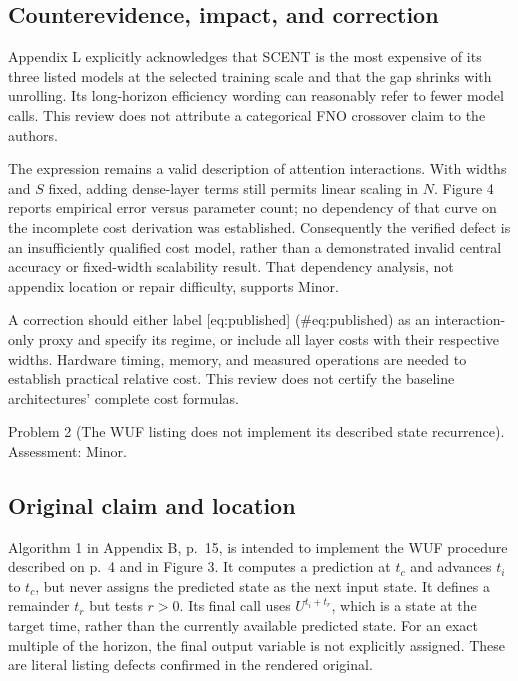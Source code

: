 \documentclass[10pt]{article}
\begin{document}
\subsection*{Counterevidence, impact, and correction}
Appendix L explicitly acknowledges that SCENT is the most expensive of its three listed models at the selected training scale and that the gap shrinks with unrolling. Its long-horizon efficiency wording can reasonably refer to fewer model calls. This review does not attribute a categorical FNO crossover claim to the authors.\par
The expression remains a valid description of attention interactions. With widths and \(S\) fixed, adding dense-layer terms still permits linear scaling in \(N\). Figure 4 reports empirical error versus parameter count; no dependency of that curve on the incomplete cost derivation was established. Consequently the verified defect is an insufficiently qualified cost model, rather than a demonstrated invalid central accuracy or fixed-width scalability result. That dependency analysis, not appendix location or repair difficulty, supports Minor.\par
A correction should either label [eq:published] (\#eq:published) as an interaction-only proxy and specify its regime, or include all layer costs with their respective widths. Hardware timing, memory, and measured operations are needed to establish practical relative cost. This review does not certify the baseline architectures’ complete cost formulas.\par
Problem 2 (The WUF listing does not implement its described state recurrence).  Assessment: Minor.\par
\subsection*{Original claim and location}
Algorithm 1 in Appendix B, p. 15, is intended to implement the WUF procedure described on p. 4 and in Figure 3. It computes a prediction at \(t_c\) and advances \(t_i\) to \(t_c\), but never assigns the predicted state as the next input state. It defines a remainder \(t_r\) but tests \(r>0\). Its final call uses \(U^{t_i+t_r}\), which is a state at the target time, rather than the currently available predicted state. For an exact multiple of the horizon, the final output variable is not explicitly assigned. These are literal listing defects confirmed in the rendered original.\par
\end{document}
